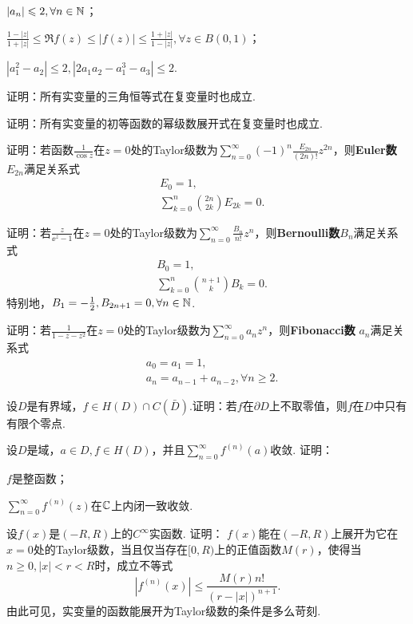 \begin{xiti}
    \begin{enuma}
      \item $|a_n|\leqslant2,\forall n\in \mathbb N$；
      \item $\frac{1-|z|}{1+|z|}\le\Re f(z)\le|f(z)|\le\frac{1+|z|}{1-|z|},\forall
          z\in B(0,1)$；
      \item $|a_1^2-a_2|\le2,|2a_1a_2-a_1^3-a_3|\le2$.
    \end{enuma}
  \item 证明：所有实变量的三角恒等式在复变量时也成立.
  \item 证明：所有实变量的初等函数的幂级数展开式在复变量时也成立.
  \item 证明：若函数$\frac1{\cos z}$在$z=0$处的Taylor级数为$\sum_{n=0}^\infty(-1)^n\frac{E_{2n}}{(2n)!}z^{2n}$，则\textbf{Euler数}
    $E_{2n}$满足关系式
    \begin{align*}
      &E_0=1,\\
      &\sum_{k=0}^n\binom{2n}{2k}E_{2k}=0.
    \end{align*}
  \item 证明：若$\frac z{\ee^z-1}$在$z=0$处的Taylor级数为$\sum_{n=0}^\infty \frac{B_n}{n!}z^n$，则\textbf{Bernoulli数}$B_n$满足关系式
      \begin{align*}
        & B_0 = 1,\\
        & \sum_{k=0}^n\binom{n+1}kB_k = 0.
      \end{align*}
      特别地，$B_1=-\frac12,B_{2n+1}=0,\forall n\in \mathbb N$.
  \item 证明：若$\frac1{1-z-z^2}$在$z=0$处的Taylor级数为$\sum_{n=0}^\infty a_nz^n$，则\textbf{Fibonacci数} $a_n$满足关系式
      \begin{align*}
        & a_0 = a_1 = 1,\\
        & a_n = a_{n-1} + a_{n-2}, \forall n\ge2.
      \end{align*}
  \item 设$D$是有界域，$f\in H(D)\cap C(\bar D)$.证明：若$f$在$\partial D$上不取零值，则$f$在$D$中只有有限个零点.
  \item 设$D$是域，$a\in D,f\in H(D)$，并且$\sum_{n=0}^\infty f^{(n)}(a)$收敛. 证明：
    \begin{enuma}
      \item $f$是整函数；
      \item $\sum_{n=0}^\infty f^{(n)}(z)$在$\mathbb C$上内闭一致收敛.
    \end{enuma}
  \item 设$f(x)$是$(-R,R)$上的$C^\infty$实函数. 证明： $f(x)$能在$(-R,R)$上展开为它在$x=0$处的Taylor级数，当且仅当存在$[0,R)$上的正值函数$M(r)$，使得当$n\ge0,|x|<r<R$时，成立不等式
      \[
        |f^{(n)}(x)| \le \frac{M(r)n!}{(r-|x|)^{n+1}}.
      \]
      由此可见，实变量的函数能展开为Taylor级数的条件是多么苛刻.
\end{xiti}

